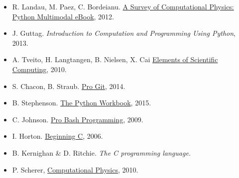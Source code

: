 \documentclass[letterpaper,10pt,onecolumn]{article}
\begin{document}
\begin{itemize}
\item  R. Landau, M. Paez, C. Bordeianu. \href{http://www.compadre.org/psrc/items/detail.cfm?ID=11578}{A Survey of Computational Physics: Python Multimodal eBook}, 2012.
\item  J. Guttag. \textit{Introduction to Computation and Programming Using Python}, 2013.
\item  A. Tveito, H. Langtangen, B. Nielsen, X. Cai  \href{http://link.springer.com.ezproxy.uniandes.edu.co:8080/book/10.1007\%2F978-3-642-11299-7}{Elements of Scientific Computing}, 2010.
\item S. Chacon, B. Straub. \href{http://link.springer.com.ezproxy.uniandes.edu.co:8080/book/10.1007\%2F978-1-4302-1834-0}{Pro Git}, 2014.
\item B. Stephenson. \href{http://link.springer.com.ezproxy.uniandes.edu.co:8080/book/10.1007\%2F978-3-319-14240-1}{The Python Workbook}, 2015.
\item C. Johnson. \href{http://link.springer.com.ezproxy.uniandes.edu.co:8080/book/10.1007\%2F978-1-4302-1998-9}{Pro Bash Programming}, 2009.
\item I. Horton. \href{http://link.springer.com.ezproxy.uniandes.edu.co:8080/book/10.1007\%2F978-1-4302-0243-1}{Beginning C}, 2006.
\item B. Kernighan \& D. Ritchie. \textit{The C programming language.}
\item P. Scherer, \href{http://link.springer.com.ezproxy.uniandes.edu.co:8080/book/10.1007\%2F978-3-642-13990-1}{Computational Physics}, 2010.
\end{itemize}

\end{document}

